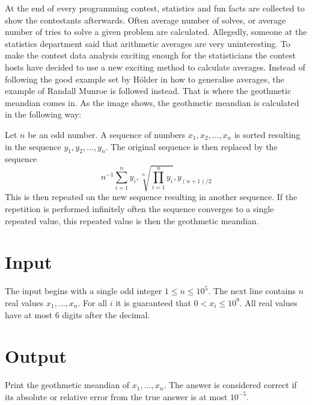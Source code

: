 
At the end of every programming contest, statistics and fun
facts are collected to show the contestants afterwards.
Often average number of solves, or average number of tries
to solve a given problem are calculated.
Allegedly, someone at the statistics department said
that arithmetic averages are very uninteresting.
To make the contest data analysis exciting enough for
the statisticians the contest hosts have decided to use
a new exciting method to calculate averages.
Instead of following the good example set by Hölder in
how to generalise averages, the example of Randall Munroe
is followed instead.
That is where the geothmetic meandian comes in.
As the image shows, the geothmetic meandian is calculated
in the following way:

Let $n$ be an odd number.
A sequence of numbers $x_1, x_2, \dots, x_n$ is sorted resulting in the sequence $y_1, y_2, \dots, y_n$.
The original sequence is then replaced by the
sequence 
\[
    n^{-1}\sum_{i = 1}^n y_i, \sqrt[n]{\prod_{i=1}^n y_i}, y_{(n+1)/2}
\]
This is then repeated on the new sequence resulting in another sequence.
If the repetition is performed infinitely often the sequence converges to a single repeated value, this
repeated value is then the geothmetic meandian.

\section*{Input}

The input begins with a single odd integer 
$1 \leq n \leq 10^5$. 
The next line contains $n$ real values $x_1, \dots, x_n$.
For all $i$ it is guaranteed that $0 < x_i \leq 10^9$.
All real values have at most $6$ digits after the decimal.

\section*{Output}

Print the geothmetic meandian of $x_1, \dots, x_n$.
The answer is considered correct if its absolute or relative
error from the true answer is at most $10^{-5}$.
